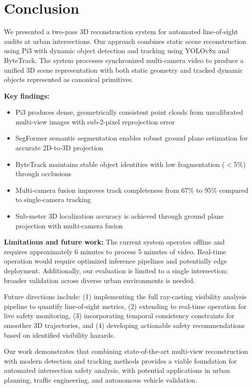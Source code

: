 \section{Conclusion}
\label{sec:conclusion}

We presented a two-pass 3D reconstruction system for automated line-of-sight audits at urban intersections. Our approach combines static scene reconstruction using Pi3 with dynamic object detection and tracking using YOLOv8x and ByteTrack. The system processes synchronized multi-camera video to produce a unified 3D scene representation with both static geometry and tracked dynamic objects represented as canonical primitives.

\textbf{Key findings:}
\begin{itemize}
    \item Pi3 produces dense, geometrically consistent point clouds from uncalibrated multi-view images with sub-2-pixel reprojection error
    \item SegFormer semantic segmentation enables robust ground plane estimation for accurate 2D-to-3D projection
    \item ByteTrack maintains stable object identities with low fragmentation ($<$5\%) through occlusions
    \item Multi-camera fusion improves track completeness from 67\% to 95\% compared to single-camera tracking
    \item Sub-meter 3D localization accuracy is achieved through ground plane projection with multi-camera fusion
\end{itemize}

\textbf{Limitations and future work:}
The current system operates offline and requires approximately 6 minutes to process 5 minutes of video. Real-time operation would require optimized inference pipelines and potentially edge deployment. Additionally, our evaluation is limited to a single intersection; broader validation across diverse urban environments is needed.

Future directions include: (1) implementing the full ray-casting visibility analysis pipeline to quantify line-of-sight metrics, (2) extending to real-time operation for live safety monitoring, (3) incorporating temporal consistency constraints for smoother 3D trajectories, and (4) developing actionable safety recommendations based on identified visibility hazards.

Our work demonstrates that combining state-of-the-art multi-view reconstruction with modern detection and tracking methods provides a viable foundation for automated intersection safety analysis, with potential applications in urban planning, traffic engineering, and autonomous vehicle validation.
